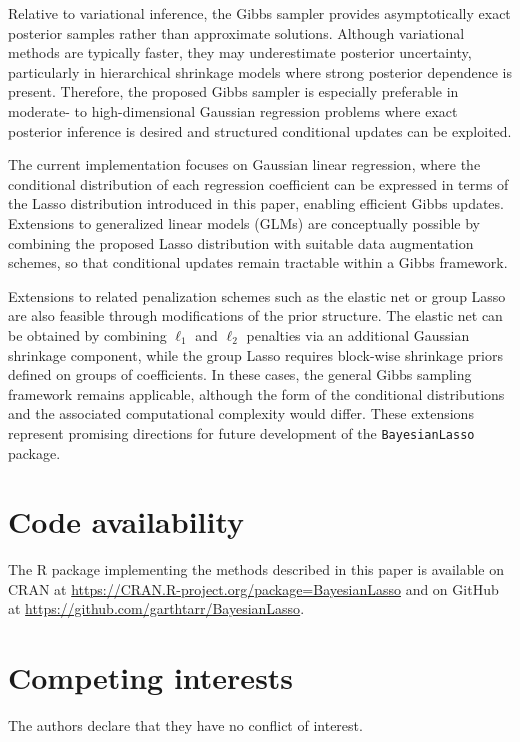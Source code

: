 Relative to variational inference, the Gibbs sampler provides asymptotically exact posterior samples rather than approximate solutions. Although variational methods are typically faster, they may underestimate posterior uncertainty, particularly in hierarchical shrinkage models where strong posterior dependence is present. Therefore, the proposed Gibbs sampler is especially preferable in moderate- to high-dimensional Gaussian regression problems where exact posterior inference is desired and structured conditional updates can be exploited.

The current implementation focuses on Gaussian linear regression, where the conditional distribution of each regression coefficient can be expressed in terms of the Lasso distribution introduced in this paper, enabling efficient Gibbs updates. Extensions to generalized linear models (GLMs) are conceptually possible by combining the proposed Lasso distribution with suitable data augmentation schemes, so that conditional updates remain tractable within a Gibbs framework. 

Extensions to related penalization schemes such as the elastic net or group Lasso are also feasible through modifications of the prior structure. The elastic net can be obtained by combining $\ell_1$ and $\ell_2$ penalties via an additional Gaussian shrinkage component, while the group Lasso requires block-wise shrinkage priors defined on groups of coefficients. In these cases, the general Gibbs sampling framework remains applicable, although the form of the conditional distributions and the associated computational complexity would differ. These extensions represent promising directions for future development of the \texttt{BayesianLasso} package.


\section{Code availability}

The R package  implementing the methods described in this paper is available on CRAN at \url{https://CRAN.R-project.org/package=BayesianLasso} and on GitHub at \url{https://github.com/garthtarr/BayesianLasso}.





\section{Competing interests}
The authors declare that they have no conflict of interest.



